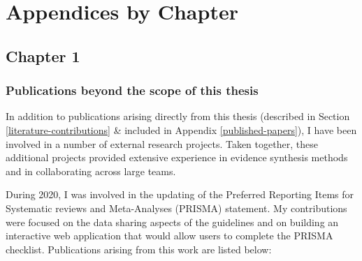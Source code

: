 \documentclass[a4paper, twoside]{templates/ociamthesis}
\begin{document}
\startappendices

\hypertarget{chapter-appendix-heading}{%
\chapter{Appendices by Chapter}\label{chapter-appendix-heading}}

\minitoc 

\newpage

\hypertarget{appendix-into}{%
\section{Chapter 1}\label{appendix-into}}

\hypertarget{appendix-publications}{%
\subsection{Publications beyond the scope of this thesis}\label{appendix-publications}}

In addition to publications arising directly from this thesis (described in Section \ref{literature-contributions} \& included in Appendix \ref{published-papers}), I have been involved in a number of external research projects. Taken together, these additional projects provided extensive experience in evidence synthesis methods and in collaborating across large teams.

During 2020, I was involved in the updating of the Preferred Reporting Items for Systematic reviews and Meta-Analyses (PRISMA) statement. My contributions were focused on the data sharing aspects of the guidelines and on building an interactive web application that would allow users to complete the PRISMA checklist. Publications arising from this work are listed below:
\end{document}
